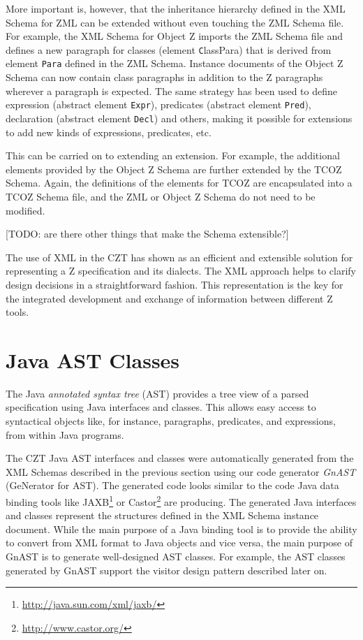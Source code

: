\documentclass{llncs}
\newcommand{\Element}[1]{\texttt{#1}}
\begin{document}
  More important is, however, that the inheritance hierarchy defined
  in the XML Schema for ZML can be extended without even touching the
  ZML Schema file.  For example, the XML Schema for Object Z imports
  the ZML Schema file and defines a new paragraph for classes (element
  \Element ClassPara) that is derived from element \Element{Para}
  defined in the ZML Schema.  Instance documents of the Object Z
  Schema can now contain class paragraphs in addition to the Z
  paragraphs wherever a paragraph is expected.  The same strategy has
  been used to define expression (abstract element \Element{Expr}),
  predicates (abstract element \Element{Pred}), declaration (abstract
  element \Element{Decl}) and others, making it possible for
  extensions to add new kinds of expressions, predicates, etc.

  This can be carried on to extending an extension.  For example, the
  additional elements provided by the Object Z Schema are further
  extended by the TCOZ Schema.  Again, the definitions of the elements
  for TCOZ are encapsulated into a TCOZ Schema file, and the ZML or
  Object Z Schema do not need to be modified.

  [TODO: are there other things that make the Schema extensible?]

  The use of XML in the CZT has shown as an efficient and extensible
  solution for representing a Z specification and its dialects.  The
  XML approach helps to clarify design decisions in a straightforward
  fashion.  This representation is the key for the integrated
  development and exchange of information between different Z tools.

\section{Java AST Classes}\label{java-ast-classes}

  The Java \emph{annotated syntax tree} (AST) provides a tree view of
  a parsed specification using Java interfaces and classes.  This
  allows easy access to syntactical objects like, for instance,
  paragraphs, predicates, and expressions, from within Java programs.

  The CZT Java AST interfaces and classes were automatically generated
  from the XML Schemas described in the previous section using our
  code generator \emph{GnAST} (GeNerator for AST).  The generated code
  looks similar to the code Java data binding tools like
  JAXB\footnote{\url{http://java.sun.com/xml/jaxb/}} or
  Castor\footnote{\url{http://www.castor.org/}} are producing.  The
  generated Java interfaces and classes represent the structures
  defined in the XML Schema instance document.  While the main purpose
  of a Java binding tool is to provide the ability to convert from XML
  format to Java objects and vice versa, the main purpose of GnAST is
  to generate well-designed AST classes.  For example, the AST classes
  generated by GnAST support the visitor design pattern described
  later on.
\end{document}
